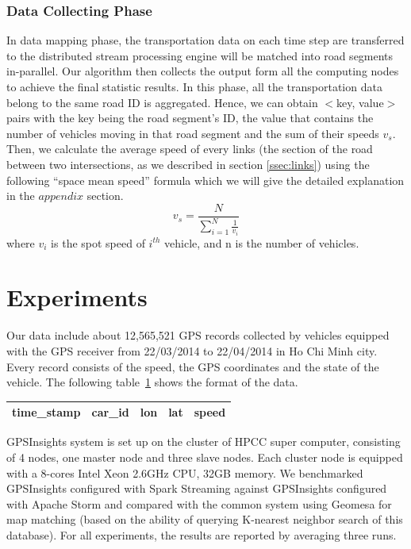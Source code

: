 \documentclass{acm_proc_article-sp}
\begin{document}
\subsubsection{Data Collecting Phase} \label{datacollectingphase} In data mapping phase, the transportation data on each time step are transferred to the distributed stream processing engine will be matched into road segments in-parallel. Our algorithm then collects the output form all the computing nodes to achieve the final statistic results.  In this phase, all the transportation data belong to the same road ID is aggregated. Hence, we can obtain $<$key, value$>$ pairs with the key being the road segment's ID, the value that contains the number of vehicles moving in that road segment and the sum of their speeds $v_{s}$. Then, we calculate the average speed of every links (the section of the road between two intersections, as we described in section \ref{ssec:links}) using the following ``space mean speed'' formula which we will give the detailed explanation in the $appendix$ section.
\[ v_{s} = \frac{N}{\sum_{i=1}^{N}\frac{1}{v_{i}}}\]
where $v_{i}$ is the spot speed of $i^{th}$ vehicle, and n is the number of vehicles.

\section{Experiments}

Our data include about 12,565,521 GPS records collected by vehicles equipped with the GPS receiver from 22/03/2014 to 22/04/2014 in Ho Chi Minh city. Every record consists of the speed, the GPS coordinates and the state of the vehicle. The following table~\ref{table:location-data} shows the format of the data.

\begin{table}[h]
\centering
\begin{tabular}{|c|c|c|c|c|}
\hline
\textbf{time\_stamp} & \textbf{car\_id} & \textbf{lon}   & \textbf{lat} & \textbf{speed} \\ \hline
\end{tabular}
\label{table:location-data}
\end{table}


GPSInsights system is set up on the cluster of HPCC super computer, consisting of 4 nodes, one master node and three slave nodes. Each cluster node is equipped with a  8-cores Intel Xeon 2.6GHz CPU, 32GB memory. We benchmarked GPSInsights configured with Spark Streaming against GPSInsights configured with Apache Storm and compared with the common system using Geomesa for map matching (based on the ability of querying K-nearest neighbor search of this database). For all experiments, the results are reported by averaging three runs. 
	
\end{document}
